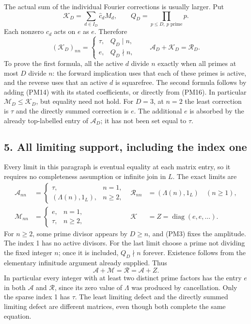 \documentclass[
  10pt,
  a4paper,
]{article}
\begin{document}
The actual sum of the individual Fourier corrections is usually larger.
Put \[
\mathcal K_D=\sum_{d\in I_D}\widehat c_dM_d,
\qquad Q_D=\prod_{p\le D,\ p\text{ prime}}p.
\tag{PM18}
\] Each nonzero \(c_d\) acts on \(e\) as \(e\). Therefore \[
(\mathcal K_D)_{nn}=\begin{cases}\tau,&Q_D\mid n,\\e,&Q_D\nmid n,\end{cases}
\qquad
\boxed{\mathcal A_D+\mathcal K_D=\mathcal R_D.}
\tag{PM19}
\] To prove the first formula, all the active \(d\) divide \(n\) exactly
when all primes at most \(D\) divide \(n\): the forward implication uses
that each of these primes is active, and the reverse uses that an active
\(d\) is squarefree. The second formula follows by adding (PM14) with
its stated coefficients, or directly from (PM16). In particular
\(\mathcal M_D\le\mathcal K_D\), but equality need not hold. For
\(D=3\), at \(n=2\) the least correction is \(\tau\) and the directly
summed correction is \(e\). The additional \(e\) is absorbed by the
already top-labelled entry of \(\mathcal A_D\); it has not been set
equal to \(\tau\).

\subsection{5. All limiting support, including the index
one}\label{all-limiting-support-including-the-index-one}

Every limit in this paragraph is eventual equality at each matrix entry,
so it requires no completeness assumption or infinite join in \(L\). The
exact limits are \[
\begin{aligned}
\mathcal A_{nn}&=\begin{cases}\tau,&n=1,\\(\Lambda(n),1_L),&n\ge2,\end{cases}
&\mathcal R_{nn}&=(\Lambda(n),1_L)\quad(n\ge1),\\
\mathcal M_{nn}&=\begin{cases}e,&n=1,\\\tau,&n\ge2,\end{cases}
&\mathcal K&=Z=\operatorname{diag}(e,e,\ldots).
\end{aligned}
\tag{PM20}
\] For \(n\ge2\), some prime divisor appears by \(D\ge n\), and (PM3)
fixes the amplitude. The index 1 has no active divisors. For the last
limit choose a prime not dividing the fixed integer \(n\); once it is
included, \(Q_D\nmid n\) forever. Existence follows from the elementary
infinitude argument already supplied. Thus \[
\boxed{\mathcal A+\mathcal M=\mathcal R=\mathcal A+Z.}
\tag{PM21}
\] In particular every integer with at least two distinct prime factors
has the entry \(e\) in both \(\mathcal A\) and \(\mathcal R\), since its
zero value of \(\Lambda\) was produced by cancellation. Only the sparse
index 1 has \(\tau\). The least limiting defect and the directly summed
limiting defect are different matrices, even though both complete the
same equation.
\end{document}
